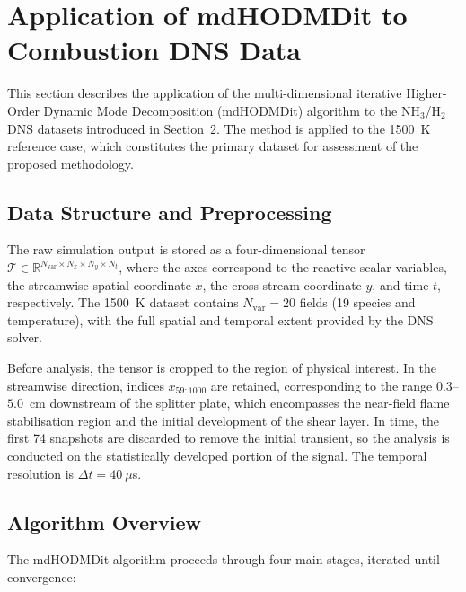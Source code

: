 \section{Application of mdHODMDit to Combustion DNS Data}

This section describes the application of the multi-dimensional iterative Higher-Order Dynamic Mode Decomposition (mdHODMDit) algorithm to the NH$_3$/H$_2$ DNS datasets introduced in Section~2. The method is applied to the 1500~K reference case, which constitutes the primary dataset for assessment of the proposed methodology.

\subsection{Data Structure and Preprocessing}

The raw simulation output is stored as a four-dimensional tensor $\mathcal{T} \in \mathbb{R}^{N_\mathrm{var} \times N_x \times N_y \times N_t}$, where the axes correspond to the reactive scalar variables, the streamwise spatial coordinate $x$, the cross-stream coordinate $y$, and time $t$, respectively. The 1500~K dataset contains $N_\mathrm{var} = 20$ fields (19 species and temperature), with the full spatial and temporal extent provided by the DNS solver.

Before analysis, the tensor is cropped to the region of physical interest. In the streamwise direction, indices $x_{59:1000}$ are retained, corresponding to the range $0.3$--$5.0$~cm downstream of the splitter plate, which encompasses the near-field flame stabilisation region and the initial development of the shear layer. In time, the first 74 snapshots are discarded to remove the initial transient, so the analysis is conducted on the statistically developed portion of the signal. The temporal resolution is $\Delta t = 40~\mu$s.

\subsection{Algorithm Overview}

The mdHODMDit algorithm proceeds through four main stages, iterated until convergence:

